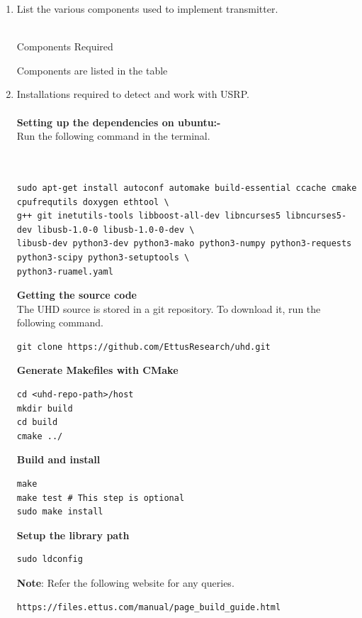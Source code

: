\begin{enumerate}[label=\arabic*.,ref=\thesection.\theenumi]
\item List the various components used to implement transmitter.
\\
\solution
\\
\begin{table}[!ht]
  \centering
  
  \caption{Components Required}
  \label{tab:txcomponents}
\end{table}
Components are listed in the table \\
\item Installations required to detect and work with USRP.\\
\\
\textbf{Setting up the dependencies on ubuntu:-}\\
Run the following command in the terminal.\\
\\
\\
\begin{lstlisting}
sudo apt-get install autoconf automake build-essential ccache cmake cpufrequtils doxygen ethtool \
g++ git inetutils-tools libboost-all-dev libncurses5 libncurses5-dev libusb-1.0-0 libusb-1.0-0-dev \
libusb-dev python3-dev python3-mako python3-numpy python3-requests python3-scipy python3-setuptools \
python3-ruamel.yaml
\end{lstlisting}
\textbf{Getting the source code}\\
The UHD source is stored in a git repository. To download it, run the following command.
\begin{lstlisting}
git clone https://github.com/EttusResearch/uhd.git
\end{lstlisting}
\textbf{Generate Makefiles with CMake}
\begin{lstlisting}
cd <uhd-repo-path>/host
mkdir build
cd build
cmake ../
\end{lstlisting}
\textbf{Build and install}
\begin{lstlisting}
make
make test # This step is optional
sudo make install
\end{lstlisting}
\newpage
\textbf{Setup the library path }
\begin{lstlisting}
sudo ldconfig
\end{lstlisting}
\textbf{Note}:
Refer the following website for any queries.
\begin{lstlisting}
https://files.ettus.com/manual/page_build_guide.html

\end{lstlisting}
\end{enumerate}

